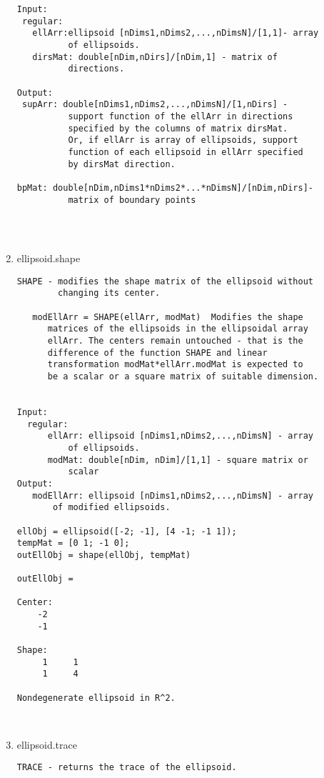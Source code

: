 \begin{enumerate}
\begin{lstlisting}
Input:
 regular:
   ellArr:ellipsoid [nDims1,nDims2,...,nDimsN]/[1,1]- array
          of ellipsoids.
   dirsMat: double[nDim,nDirs]/[nDim,1] - matrix of
          directions.

Output:
 supArr: double[nDims1,nDims2,...,nDimsN]/[1,nDirs] -
          support function of the ellArr in directions
          specified by the columns of matrix dirsMat.
          Or, if ellArr is array of ellipsoids, support
          function of each ellipsoid in ellArr specified
          by dirsMat direction.

bpMat: double[nDim,nDims1*nDims2*...*nDimsN]/[nDim,nDirs]-
          matrix of boundary points




\end{lstlisting}
\fontfamily{\familydefault}
\selectfont
\item {ellipsoid.shape}
\selectfont
\begin{lstlisting}
SHAPE - modifies the shape matrix of the ellipsoid without
        changing its center.

   modEllArr = SHAPE(ellArr, modMat)  Modifies the shape
      matrices of the ellipsoids in the ellipsoidal array
      ellArr. The centers remain untouched - that is the
      difference of the function SHAPE and linear
      transformation modMat*ellArr.modMat is expected to
      be a scalar or a square matrix of suitable dimension.


Input:
  regular:
      ellArr: ellipsoid [nDims1,nDims2,...,nDimsN] - array
          of ellipsoids.
      modMat: double[nDim, nDim]/[1,1] - square matrix or
          scalar
Output:
   modEllArr: ellipsoid [nDims1,nDims2,...,nDimsN] - array
       of modified ellipsoids.

ellObj = ellipsoid([-2; -1], [4 -1; -1 1]);
tempMat = [0 1; -1 0];
outEllObj = shape(ellObj, tempMat)

outEllObj =

Center:
    -2
    -1

Shape:
     1     1
     1     4

Nondegenerate ellipsoid in R^2.



\end{lstlisting}
\fontfamily{\familydefault}
\selectfont
\item {ellipsoid.trace}
\selectfont
\begin{lstlisting}
TRACE - returns the trace of the ellipsoid.


\end{lstlisting}
\end{enumerate}

